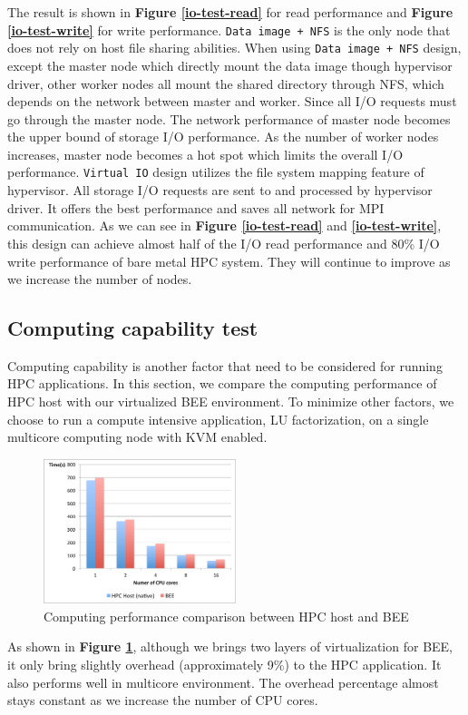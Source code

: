 The result is shown in \textbf{Figure \ref{io-test-read}} for read performance and \textbf{Figure \ref{io-test-write}} for write performance. \texttt{Data image + NFS} is the only node that does not rely on host file sharing abilities. When using \texttt{Data image + NFS} design, except the master node which directly mount the data image though hypervisor driver, other worker nodes all mount the shared directory through NFS, which depends on the network between master and worker. Since all I/O requests must go through the master node. The network performance of master node becomes the upper bound of storage I/O performance. As the number of worker nodes increases, master node becomes a hot spot which limits the overall I/O performance.  \texttt{Virtual IO} design utilizes the file system mapping feature of hypervisor. All storage I/O requests are sent to and processed by hypervisor driver. It offers the best performance and saves all network for MPI communication. As we can see in \textbf{Figure \ref{io-test-read}} and \textbf{\ref{io-test-write}}, this design can achieve almost half of the I/O read performance and 80\% I/O write performance of bare metal HPC system. They will continue to improve as we increase the number of nodes.

\subsection{Computing capability test}
Computing capability is another factor that need to be considered for running HPC applications. In this section, we compare the computing performance of HPC host with our virtualized BEE environment. To minimize other factors, we choose to run a compute intensive application, LU factorization, on a single multicore computing node with KVM enabled.

\begin{figure}[h]
    \centering
    \caption{Computing performance comparison between HPC host and BEE}
    \label{comp-test}
    \includegraphics[width=0.5\textwidth]{figures/lu.pdf}
\end{figure}
 As shown in \textbf{Figure \ref{comp-test}}, although we brings two layers of virtualization for BEE, it only bring slightly overhead (approximately 9\%) to the HPC application. It also performs well in multicore environment. The overhead percentage almost stays constant as we increase the number of CPU cores.

